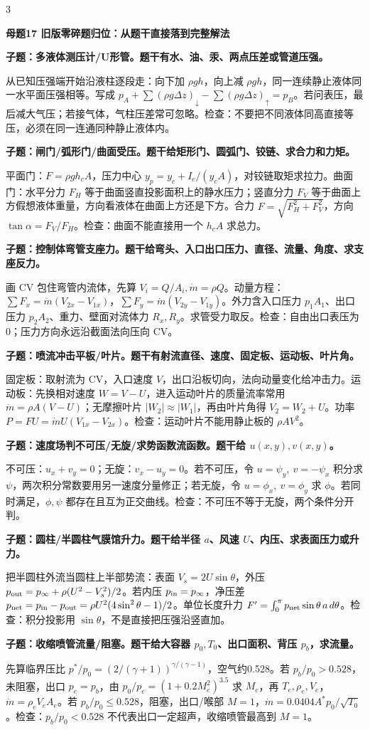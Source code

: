 \documentclass[a4paper]{article}
\newcommand{\mt}[1]{\vspace{0.45pt}\colorbox{M}{\parbox{\dimexpr\linewidth-2\fboxsep}{\color{white}\bfseries #1}}\par}
\newcommand{\qt}[1]{\vspace{0.25pt}\colorbox{Q}{\parbox{\dimexpr\linewidth-2\fboxsep}{\color{white}\bfseries #1}}\par}
\newcommand{\ans}[1]{\colorbox{G}{\parbox{\dimexpr\linewidth-2\fboxsep}{#1}}\par}
\begin{document}
\begin{multicols}{3}
\mt{母题17 旧版零碎题归位：从题干直接落到完整解法}
\qt{子题：多液体测压计/U形管。题干有水、油、汞、两点压差或管道压强。}
\ans{从已知压强端开始沿液柱逐段走：向下加 $\rho gh$，向上减 $\rho gh$，同一连续静止液体同一水平面压强相等。写成 $p_A+\sum(\rho g\Delta z)_{\downarrow}-\sum(\rho g\Delta z)_{\uparrow}=p_B$。若问表压，最后减大气压；若接气体，气柱压差常可忽略。检查：不要把不同液体同高直接等压，必须在同一连通同种静止液体内。}
\qt{子题：闸门/弧形门/曲面受压。题干给矩形门、圆弧门、铰链、求合力和力矩。}
\ans{平面门：$F=\rho gh_cA$，压力中心 $y_p=y_c+I_c/(y_cA)$，对铰链取矩求拉力。曲面门：水平分力 $F_H$ 等于曲面竖直投影面积上的静水压力；竖直分力 $F_V$ 等于曲面上方假想液体重量，方向看液体在曲面上方还是下方。合力 $F=\sqrt{F_H^2+F_V^2}$，方向 $\tan\alpha=F_V/F_H$。检查：曲面不能直接用一个 $h_cA$ 求总力。}
\qt{子题：控制体弯管支座力。题干给弯头、入口出口压力、直径、流量、角度、求支座反力。}
\ans{画 CV 包住弯管内流体，先算 $V_i=Q/A_i,\dot m=\rho Q$。动量方程：$\sum F_x=\dot m(V_{2x}-V_{1x})$，$\sum F_y=\dot m(V_{2y}-V_{1y})$。外力含入口压力 $p_1A_1$、出口压力 $p_2A_2$、重力、壁面对流体力 $R_x,R_y$。求管受力取反。检查：自由出口表压为0；压力方向永远沿截面法向压向 CV。}
\qt{子题：喷流冲击平板/叶片。题干有射流直径、速度、固定板、运动板、叶片角。}
\ans{固定板：取射流为 CV，入口速度 $V$，出口沿板切向，法向动量变化给冲击力。运动板：先换相对速度 $W=V-U$，进入运动叶片的质量流率常用 $\dot m=\rho A(V-U)$；无摩擦叶片 $|W_2|\approx |W_1|$，再由叶片角得 $V_2=W_2+U$。功率 $P=FU=\dot mU(V_{1x}-V_{2x})$。检查：运动叶片不能用静止板的 $\rho AV^2$。}
\qt{子题：速度场判不可压/无旋/求势函数流函数。题干给 $u(x,y),v(x,y)$。}
\ans{不可压：$u_x+v_y=0$；无旋：$v_x-u_y=0$。若不可压，令 $u=\psi_y,\ v=-\psi_x$ 积分求 $\psi$，两次积分常数要用另一速度分量修正；若无旋，令 $u=\phi_x,\ v=\phi_y$ 求 $\phi$。若同时满足，$\phi,\psi$ 都存在且互为正交曲线。检查：不可压不等于无旋，两个条件分开判。}
\qt{子题：圆柱/半圆柱气膜馆升力。题干给半径 $a$、风速 $U$、内压、求表面压力或升力。}
\ans{把半圆柱外流当圆柱上半部势流：表面 $V_s=2U\sin\theta$，外压 $p_{\rm out}=p_\infty+\rho(U^2-V_s^2)/2$。若内压 $p_{\rm in}=p_\infty$，净压差 $p_{\rm net}=p_{\rm in}-p_{\rm out}=\rho U^2(4\sin^2\theta-1)/2$。单位长度升力 $F'=\int_0^\pi p_{\rm net}\sin\theta\,a\,d\theta$。检查：积分投影用 $\sin\theta$，不是直接把压强沿竖直加。}
\qt{子题：收缩喷管流量/阻塞。题干给大容器 $p_0,T_0$、出口面积、背压 $p_b$，求流量。}
\ans{先算临界压比 $p^*/p_0=(2/(\gamma+1))^{\gamma/(\gamma-1)}$，空气约0.528。若 $p_b/p_0>0.528$，未阻塞，出口 $p_e=p_b$，由 $p_0/p_e=(1+0.2M_e^2)^{3.5}$ 求 $M_e$，再 $T_e,\rho_e,V_e$，$\dot m=\rho_eV_eA_e$。若 $p_b/p_0\le0.528$，阻塞，出口/喉部 $M=1$，$\dot m=0.0404A^*p_0/\sqrt{T_0}$。检查：$p_b/p_0<0.528$ 不代表出口一定超声，收缩喷管最高到 $M=1$。}

\end{multicols}
\end{document}
